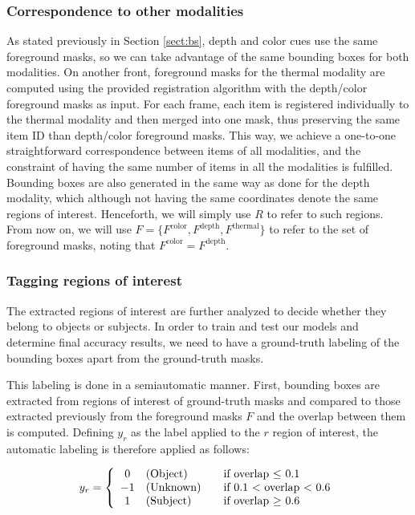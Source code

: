 \documentclass[10pt,twocolumn,letterpaper]{article}
\begin{document}
\subsubsection{Correspondence to other modalities} 
\label{sssec:correspondence}
As stated previously in Section \ref{sect:bs}, depth and color cues use the same foreground masks, so we can take advantage of the same bounding boxes for both modalities. On another front, foreground masks for the thermal modality are computed using the provided registration algorithm with the depth/color foreground masks as input. For each frame, each item is registered individually to the thermal modality and then merged into one mask, thus preserving the same item ID than depth/color foreground masks. This way, we achieve a one-to-one straightforward correspondence between items of all modalities, and the constraint of having the same number of items in all the modalities is fulfilled. Bounding boxes are also generated in the same way as done for the depth modality, which although not having the same coordinates denote the same regions of interest. Henceforth, we will simply use $R$ to refer to such regions. From now on, we will use $F = \{F^\mathrm{color}, F^\mathrm{depth}, F^\mathrm{thermal}\}$ to refer to the set of foreground masks, noting that $F^\mathrm{color} = F^\mathrm{depth}$.

\subsubsection{Tagging regions of interest}
\label{sssec:tagging}
The extracted regions of interest are further analyzed to decide whether they belong to objects or subjects. In order to train and test our models and determine final accuracy results, we need to have a ground-truth labeling of the bounding boxes apart from the ground-truth masks. 

This labeling is done in a semiautomatic manner. First, bounding boxes are extracted from regions of interest of ground-truth masks and compared to those extracted previously from the foreground masks $F$ and the overlap between them is computed. Defining $y_r$ as the label applied to the $r$ region of interest, the automatic labeling is therefore applied as follows: 

\begin{gather}
\text{$y_r$} = \left\{ 
  \begin{array}{c l l}
    0  & \text{(Object)} & \quad \text{if overlap $\leq$ 0.1 }\\
    -1 & \text{(Unknown)} & \quad \text{if 0.1 $<$ overlap $<$ 0.6}\\
    1 & \text{(Subject)} & \quad \text{if overlap $\geq$ 0.6 }
  \end{array} \right.
 \end{gather}
\end{document}
